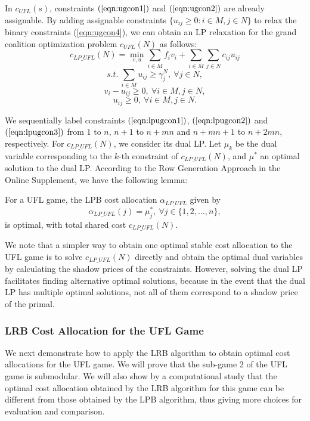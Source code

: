 \documentclass[ijoc,nonblindrev]{informs3} %
\begin{document}
In $c_{UFL}(s)$, constraints $(\ref{eqn:ugcon1})$ and  $(\ref{eqn:ugcon2})$ are already assignable. By adding assignable constraints $\{u_{ij} \geq 0:i \in M, j \in N\}$ to relax the binary constraints (\ref{eqn:ugcon4}), we can obtain an LP relaxation for the grand coalition optimization problem $c_{UFL}(N)$ as follows:
\begin{equation*}\label{eqn:lpugobj}
c_{LP\_UFL}(N) = \min_{v,u} \sum_{i \in M} f_iv_i + \sum_{i \in M} \sum_{j \in N} c_{ij}u_{ij}
\end{equation*}
\begin{equation} \label{eqn:lpugcon1}
s.t.~\sum_{i \in M} u_{ij} \geq \gamma_j^N, ~\forall j \in N,
\end{equation}
\begin{equation}\label{eqn:lpugcon2}
v_i - u_{ij} \geq 0, ~\forall i \in M, j \in N,
\end{equation}
\begin{equation}\label{eqn:lpugcon3}
u_{ij} \geq 0, ~\forall i \in M, j \in N.
\end{equation}

We sequentially label constraints $(\ref{eqn:lpugcon1})$, $(\ref{eqn:lpugcon2})$ and $(\ref{eqn:lpugcon3})$ from $1$ to $n$, $n+1$ to $n+mn$ and $n+mn+1$ to $n+2mn$, respectively.
For $c_{LP\_UFL}(N)$, we consider its dual LP. Let $\mu_k$  be the dual variable corresponding to the $k$-th constraint of $c_{LP\_UFL}(N)$, and $\mu^*$ an optimal solution to the dual LP.
According to the Row Generation Approach in the Online Supplement, we have the following lemma:
\begin{lemma}\label{lemma:lpbcaufl}
For a UFL game, the LPB cost allocation $\alpha_{LP\_UFL}$ given by
\begin{equation*}
\alpha_{LP\_UFL}(j) = \mu_j^*, ~\forall j \in \big\{1,2,\ldots,n\big\},
\end{equation*}
is optimal, with total shared cost $c_{LP\_UFL}(N)$.
\end{lemma}

We note that a simpler way to obtain one optimal stable cost allocation to the UFL game is to solve $c_{LP\_UFL}(N)$ directly and obtain the optimal dual variables by calculating the shadow prices of the constraints.
However, solving the dual LP facilitates finding alternative optimal solutions, because in the event that the dual LP has multiple optimal solutions, not all of them correspond to a shadow price of the primal.


\subsubsection{LRB Cost Allocation for the UFL Game}\label{section:UFLLRB}
We next demonstrate how to apply the LRB algorithm to obtain optimal cost allocations for the UFL game. We will prove that the sub-game 2 of the UFL game is submodular. We will also show by a computational study that the optimal cost allocation obtained by the LRB algorithm for this game can be different from those obtained by the LPB algorithm, thus giving more choices for evaluation and comparison.
\end{document}
